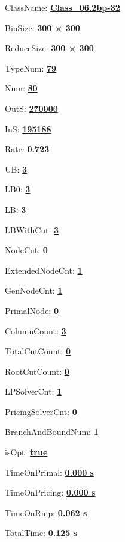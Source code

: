 \documentclass[11pt]{article}
\begin{document}
\pagestyle{empty}


ClassName: \underline{\textbf{Class_06.2bp-32}}
\par
BinSize: \underline{\textbf{300 × 300}}
\par
ReduceSize: \underline{\textbf{300 × 300}}
\par
TypeNum: \underline{\textbf{79}}
\par
Num: \underline{\textbf{80}}
\par
OutS: \underline{\textbf{270000}}
\par
InS: \underline{\textbf{195188}}
\par
Rate: \underline{\textbf{0.723}}
\par
UB: \underline{\textbf{3}}
\par
LB0: \underline{\textbf{3}}
\par
LB: \underline{\textbf{3}}
\par
LBWithCut: \underline{\textbf{3}}
\par
NodeCut: \underline{\textbf{0}}
\par
ExtendedNodeCnt: \underline{\textbf{1}}
\par
GenNodeCnt: \underline{\textbf{1}}
\par
PrimalNode: \underline{\textbf{0}}
\par
ColumnCount: \underline{\textbf{3}}
\par
TotalCutCount: \underline{\textbf{0}}
\par
RootCutCount: \underline{\textbf{0}}
\par
LPSolverCnt: \underline{\textbf{1}}
\par
PricingSolverCnt: \underline{\textbf{0}}
\par
BranchAndBoundNum: \underline{\textbf{1}}
\par
isOpt: \underline{\textbf{true}}
\par
TimeOnPrimal: \underline{\textbf{0.000 s}}
\par
TimeOnPricing: \underline{\textbf{0.000 s}}
\par
TimeOnRmp: \underline{\textbf{0.062 s}}
\par
TotalTime: \underline{\textbf{0.125 s}}
\par
\newpage
\end{document}
